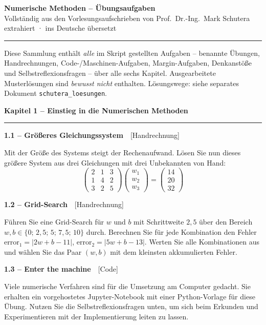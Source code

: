 \documentclass[a4paper,10pt]{article}
\newcommand{\kapitel}[1]{%
  \par\vspace{7pt}
  {\large\bfseries\color{accent} #1}\par
  \noindent\textcolor{accent}{\rule{\linewidth}{0.8pt}}\par\vspace{2pt}}
\newcommand{\aufg}[2]{%
  \par\vspace{3pt}
  {\bfseries\color{accent2} #1}~~{\footnotesize\color{accent2}[#2]}\par\vspace{1pt}}
\begin{document}
\begin{center}
  {\Large\bfseries\color{accent} Numerische Methoden -- Übungsaufgaben}\\[1pt]
  {\small Vollständig aus den Vorlesungsaufschrieben von Prof.\ Dr.-Ing.\ Mark
   Schutera extrahiert \;·\; ins Deutsche übersetzt}
\end{center}
\noindent\textcolor{rulecol}{\rule{\linewidth}{0.4pt}}

{\footnotesize Diese Sammlung enthält \emph{alle} im Skript gestellten Aufgaben
-- benannte Übungen, Handrechnungen, Code-/Maschinen-Aufgaben, Margin-Aufgaben,
Denkanstöße und Selbstreflexionsfragen -- über alle sechs Kapitel. Ausgearbeitete
Musterlösungen sind \emph{bewusst nicht} enthalten. Lösungswege: siehe separates
Dokument \texttt{schutera\_loesungen}.}

\kapitel{Kapitel 1 \;--\; Einstieg in die Numerischen Methoden}

\aufg{1.1 \;--\; Größeres Gleichungssystem}{Handrechnung}
Mit der Größe des Systems steigt der Rechenaufwand. Lösen Sie nun dieses größere
System aus drei Gleichungen mit drei Unbekannten von Hand:
\[
  \begin{pmatrix}2&1&3\\1&4&2\\3&2&5\end{pmatrix}
  \begin{pmatrix}w_1\\w_2\\w_3\end{pmatrix}=\begin{pmatrix}14\\20\\32\end{pmatrix}
\]

\aufg{1.2 \;--\; Grid-Search}{Handrechnung}
Führen Sie eine Grid-Search für $w$ und $b$ mit Schrittweite $2{,}5$ über den
Bereich $w,b\in\{0;\,2{,}5;\,5;\,7{,}5;\,10\}$ durch. Berechnen Sie für jede
Kombination den Fehler $\mathrm{error}_1=|2w+b-11|$, $\mathrm{error}_2=|5w+b-13|$.
Werten Sie alle Kombinationen aus und wählen Sie das Paar $(w,b)$ mit dem
kleinsten akkumulierten Fehler.

\aufg{1.3 \;--\; Enter the machine}{Code}
Viele numerische Verfahren sind für die Umsetzung am Computer gedacht. Sie
erhalten ein vorgehostetes Jupyter-Notebook mit einer Python-Vorlage für diese
Übung. Nutzen Sie die Selbstreflexionsfragen unten, um sich beim Erkunden und
Experimentieren mit der Implementierung leiten zu lassen.
\end{document}
